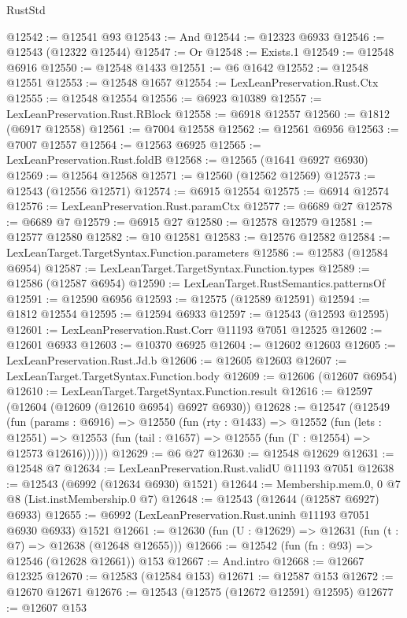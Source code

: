 \begin{lexlean}{RustStd}
\begin{coremodule}
@12542 := @12541 @93
@12543 := And
@12544 := @12323 @6933
@12546 := @12543 (@12322 @12544)
@12547 := Or
@12548 := Exists.{1}
@12549 := @12548 @6916
@12550 := @12548 @1433
@12551 := @6 @1642
@12552 := @12548 @12551
@12553 := @12548 @1657
@12554 := LexLeanPreservation.Rust.Ctx
@12555 := @12548 @12554
@12556 := @6923 @10389
@12557 := LexLeanPreservation.Rust.RBlock
@12558 := @6918 @12557
@12560 := @1812 (@6917 @12558)
@12561 := @7004 @12558
@12562 := @12561 @6956
@12563 := @7007 @12557
@12564 := @12563 @6925
@12565 := LexLeanPreservation.Rust.foldB
@12568 := @12565 (@1641 @6927 @6930)
@12569 := @12564 @12568
@12571 := @12560 (@12562 @12569)
@12573 := @12543 (@12556 @12571)
@12574 := @6915 @12554
@12575 := @6914 @12574
@12576 := LexLeanPreservation.Rust.paramCtx
@12577 := @6689 @27
@12578 := @6689 @7
@12579 := @6915 @27
@12580 := @12578 @12579
@12581 := @12577 @12580
@12582 := @10 @12581
@12583 := @12576 @12582
@12584 := LexLeanTarget.TargetSyntax.Function.parameters
@12586 := @12583 (@12584 @6954)
@12587 := LexLeanTarget.TargetSyntax.Function.types
@12589 := @12586 (@12587 @6954)
@12590 := LexLeanTarget.RustSemantics.patternsOf
@12591 := @12590 @6956
@12593 := @12575 (@12589 @12591)
@12594 := @1812 @12554
@12595 := @12594 @6933
@12597 := @12543 (@12593 @12595)
@12601 := LexLeanPreservation.Rust.Corr @11193 @7051 @12525
@12602 := @12601 @6933
@12603 := @10370 @6925
@12604 := @12602 @12603
@12605 := LexLeanPreservation.Rust.Jd.b
@12606 := @12605 @12603
@12607 := LexLeanTarget.TargetSyntax.Function.body
@12609 := @12606 (@12607 @6954)
@12610 := LexLeanTarget.TargetSyntax.Function.result
@12616 := @12597 (@12604 (@12609 (@12610 @6954) @6927 @6930))
@12628 := @12547
    (@12549
      (fun (params : @6916) =>
      @12550
        (fun (rty : @1433) =>
        @12552
          (fun (lets : @12551) =>
          @12553 (fun (tail : @1657) => @12555 (fun (Γ : @12554) => @12573 @12616))))))
@12629 := @6 @27
@12630 := @12548 @12629
@12631 := @12548 @7
@12634 := LexLeanPreservation.Rust.validU @11193 @7051
@12638 := @12543 (@6992 (@12634 @6930) @1521)
@12644 := Membership.mem.{0, 0} @7 @8 (List.instMembership.{0} @7)
@12648 := @12543 (@12644 (@12587 @6927) @6933)
@12655 := @6992 (LexLeanPreservation.Rust.uninh @11193 @7051 @6930 @6933) @1521
@12661 := @12630 (fun (U : @12629) => @12631 (fun (t : @7) => @12638 (@12648 @12655)))
@12666 := @12542 (fun (fn : @93) => @12546 (@12628 @12661)) @153
@12667 := And.intro
@12668 := @12667 @12325
@12670 := @12583 (@12584 @153)
@12671 := @12587 @153
@12672 := @12670 @12671
@12676 := @12543 (@12575 (@12672 @12591) @12595)
@12677 := @12607 @153

\end{coremodule}
\end{lexlean}
